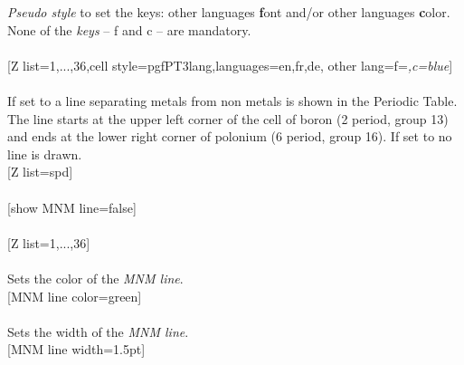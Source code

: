 %
{\textit{Pseudo style} to set the keys: other languages \textbf{f}ont and/or other languages \textbf{c}olor. %
None of the \textit{keys} -- f and c -- are mandatory.
\\ [3pt]%
}%
\\ [5pt][Z list={1,...,36},cell style=pgfPT3lang,languages={en,fr,de}, other lang={f=\string\tiny\string\itshape,c=blue}]%
\\ [10pt]\makebox[\linewidth][c]{\scalebox{.6}{\pgfPT[Z list={1,...,36},cell style=pgfPT3lang,languages={en,fr,de}, other lang={f=\tiny\itshape,c=blue}]}}%
\\ [0pt]\pgfPTendstyle%
\label{option_show MNM line}%
%
{If set to  a line separating metals from non metals is shown in the Periodic Table. The line starts at the upper left corner of the cell of boron (2\raisebox{3.5pt}{\footnotesize nd} period, group 13) and ends at the lower right corner of polonium (6\raisebox{3.5pt}{\footnotesize th} period, group 16). If set to  no line is drawn.
}%
\\ [5pt][Z list=spd]%
\\ [10pt]\makebox[\linewidth][c]{\scalebox{.6}{\pgfPT[Z list=spd]}}%
\\ [10pt][show MNM line=false]%
\\ [10pt]\makebox[\linewidth][c]{\scalebox{.6}{\pgfPT[show MNM line=false]}}%
\\ [10pt][Z list={1,...,36}]%
\\ [10pt]\makebox[\linewidth][c]{\scalebox{.6}{\pgfPT[Z list={1,...,36}]}}%
\\ [0pt]\pgfPTendoption%
\label{option_MNM line color}%
%
{Sets the color of the \textit{MNM line}.}%
\\ [5pt][MNM line color=green]%
\\ [10pt]\makebox[\linewidth][c]{\scalebox{.6}{\pgfPT[MNM line color=green]}}%
\\ [0pt]\pgfPTendoption%
\label{option_MNM line width}%
%
{Sets the width of the \textit{MNM line}.}%
\\ [5pt][MNM line width=1.5pt]%
